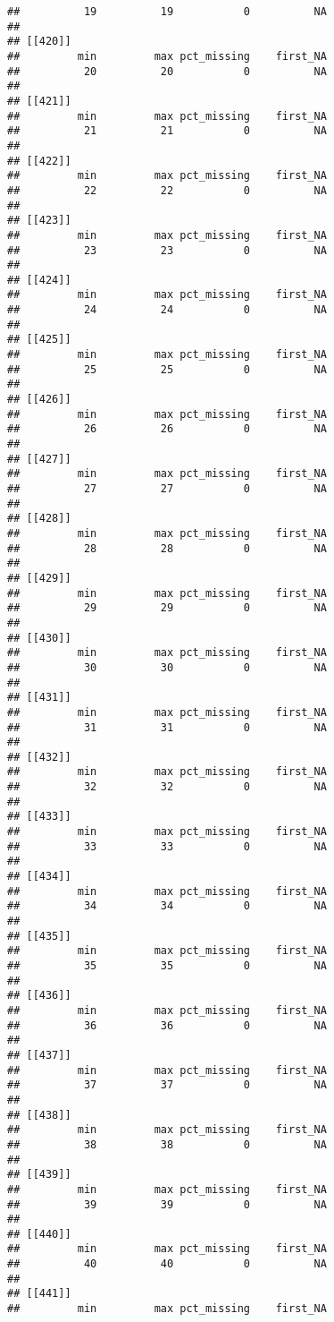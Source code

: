 \documentclass[
]{article}
\begin{document}
\begin{verbatim}
##          19          19           0          NA 
## 
## [[420]]
##         min         max pct_missing    first_NA 
##          20          20           0          NA 
## 
## [[421]]
##         min         max pct_missing    first_NA 
##          21          21           0          NA 
## 
## [[422]]
##         min         max pct_missing    first_NA 
##          22          22           0          NA 
## 
## [[423]]
##         min         max pct_missing    first_NA 
##          23          23           0          NA 
## 
## [[424]]
##         min         max pct_missing    first_NA 
##          24          24           0          NA 
## 
## [[425]]
##         min         max pct_missing    first_NA 
##          25          25           0          NA 
## 
## [[426]]
##         min         max pct_missing    first_NA 
##          26          26           0          NA 
## 
## [[427]]
##         min         max pct_missing    first_NA 
##          27          27           0          NA 
## 
## [[428]]
##         min         max pct_missing    first_NA 
##          28          28           0          NA 
## 
## [[429]]
##         min         max pct_missing    first_NA 
##          29          29           0          NA 
## 
## [[430]]
##         min         max pct_missing    first_NA 
##          30          30           0          NA 
## 
## [[431]]
##         min         max pct_missing    first_NA 
##          31          31           0          NA 
## 
## [[432]]
##         min         max pct_missing    first_NA 
##          32          32           0          NA 
## 
## [[433]]
##         min         max pct_missing    first_NA 
##          33          33           0          NA 
## 
## [[434]]
##         min         max pct_missing    first_NA 
##          34          34           0          NA 
## 
## [[435]]
##         min         max pct_missing    first_NA 
##          35          35           0          NA 
## 
## [[436]]
##         min         max pct_missing    first_NA 
##          36          36           0          NA 
## 
## [[437]]
##         min         max pct_missing    first_NA 
##          37          37           0          NA 
## 
## [[438]]
##         min         max pct_missing    first_NA 
##          38          38           0          NA 
## 
## [[439]]
##         min         max pct_missing    first_NA 
##          39          39           0          NA 
## 
## [[440]]
##         min         max pct_missing    first_NA 
##          40          40           0          NA 
## 
## [[441]]
##         min         max pct_missing    first_NA 

\end{verbatim}
\end{document}
